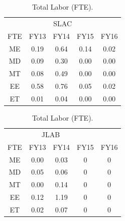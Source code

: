 \begin{table}[htdp]
\caption{Total Labor (FTE).}
\begin{center}
\parbox{.45\linewidth}{
\begin{tabular}{c||cccc}
\multicolumn{5}{c}{SLAC}\\
 FTE	&FY13	&FY14	&FY15&	FY16\\
 \hline\hline
ME	&0.19	&0.64&	0.14&	0.02\\
MD&	0.09	&0.30&	0.00&	0.00\\
MT&	0.08	&0.49&	0.00	&0.00\\
EE &	0.58	&0.76&	0.05	&0.02\\
ET&	0.01	&0.04&	0.00	&0.00\\
\end{tabular}
}
\parbox{.45\linewidth}{
\begin{tabular}{c||cccc}
\multicolumn{4}{c}{JLAB}\\
 FTE	&FY13	&FY14	&	FY15&FY16\\
 \hline\hline
ME	&0.00	&0.03&	0&0 \\
MD&	0.05	&0.06&	0 &0\\
MT&	0.00	&0.14& 0&0\\
EE &	0.12	&1.19&0&0\\
ET&	0.02	&0.07&0&0\\
\end{tabular}
}
\end{center}
\label{tb:engin}
\end{table}%

